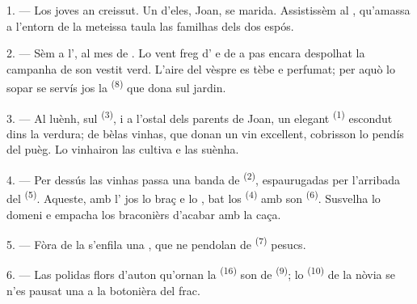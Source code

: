 
\VUsaut{4.0mm}
\VUsaut{1.6mm}
\VUsaut{3.2mm}

\VUsaut{1.6mm}
\VUsaut{2.6mm}

\VUsaut{3.0mm}

1. --- Los joves an creissut. Un d'eles, Joan, se marida. Assistissèm al
, qu'amassa a l'entorn de la meteissa taula las familhas
dels dos espós.

2. --- Sèm a l', al mes de . Lo vent freg
d' e de  a pas encara despolhat la campanha de
son vestit verd. L'aire del vèspre es tèbe e perfumat; per aquò lo sopar se
servís jos la  \textsuperscript{(8)} que dona sul jardin.

3. --- Al luènh, sul  \textsuperscript{(3)}, i a l'ostal dels parents
de Joan, un elegant  \textsuperscript{(1)} escondut dins la verdura;
de bèlas vinhas, que donan un vin excellent, cobrisson lo pendís del puèg. Lo
vinhairon las cultiva e las suènha.

4. --- Per dessús las vinhas passa una banda de 
\textsuperscript{(2)}, espaurugadas per l'arribada del 
\textsuperscript{(5)}. Aqueste, amb l' jos lo braç e lo
, bat los 
\textsuperscript{(4)} amb son  \textsuperscript{(6)}. Susvelha lo
domeni e empacha los braconièrs d'acabar amb la caça.

5. --- Fòra de la  s'enfila una , que ne pendolan
de  \textsuperscript{(7)} pesucs.

6. --- Las polidas flors d'auton qu'ornan la 
\textsuperscript{(16)} son de  \textsuperscript{(9)}; lo
 \textsuperscript{(10)} de la nòvia se n'es pausat una a la
botonièra del frac.

